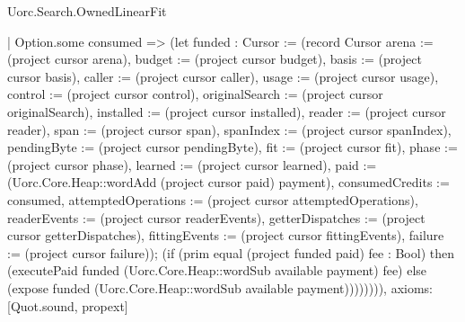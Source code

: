 \begin{lexlean}{Uorc.Search.OwnedLinearFit}
\begin{semanticmodule}
{    | Option.some consumed => (let funded : Cursor := (record Cursor {arena := (project cursor arena), budget := (project cursor budget), basis := (project cursor basis), caller := (project cursor caller), usage := (project cursor usage), control := (project cursor control), originalSearch := (project cursor originalSearch), installed := (project cursor installed), reader := (project cursor reader), span := (project cursor span), spanIndex := (project cursor spanIndex), pendingByte := (project cursor pendingByte), fit := (project cursor fit), phase := (project cursor phase), learned := (project cursor learned), paid := (Uorc.Core.Heap::wordAdd (project cursor paid) payment), consumedCredits := consumed, attemptedOperations := (project cursor attemptedOperations), readerEvents := (project cursor readerEvents), getterDispatches := (project cursor getterDispatches), fittingEvents := (project cursor fittingEvents), failure := (project cursor failure)}); (if (prim equal (project funded paid) fee : Bool) then (executePaid funded (Uorc.Core.Heap::wordSub available payment) fee) else (expose funded (Uorc.Core.Heap::wordSub available payment)))))))),
  axioms: [Quot.sound, propext]
}


\end{semanticmodule}
\end{lexlean}
